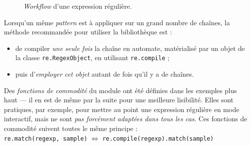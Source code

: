 \begin{figure}
\centering
{}
\caption{\label{fig:XI.2}\emph{Workflow} d'une expression régulière.}
\end{figure}

Lorsqu'un même \textit{pattern} est à appliquer sur un grand nombre de chaînes, la méthode recommandée pour utiliser la bibliothèque est :
\begin{itemize}
\item de compiler \textit{une seule fois} la chaîne en automate, matérialisé par un objet de la classe \texttt{re.RegexObject}, en utilisant \texttt{re.compile} ;
\item puis d'\textit{employer cet objet} autant de fois qu'il y a de chaînes.
\end{itemize}

Des \textit{fonctions de commodité} du module ont été définies dans les exemples plus haut --- il en est de même par la suite pour une meilleure lisibilité. Elles sont pratiques, par exemple, pour mettre au point une expression régulière en mode interactif, mais ne sont \textit{pas forcément adaptées dans tous les cas}. 
Ces fonctions de commodité suivent toutes le même principe :\\[2pt]
\texttt{re.match(regexp, sample)} $\Leftrightarrow$ \texttt{re.compile(regexp).match(sample)}

